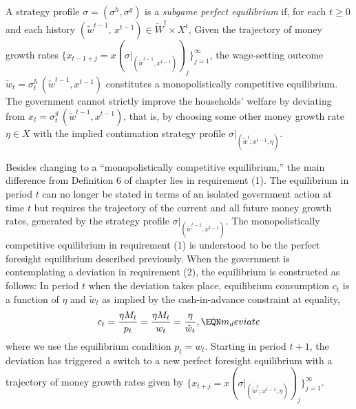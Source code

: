\smallskip
{}  A strategy profile $\sigma = (\sigma^h,\sigma^g)$
is a {\it subgame perfect equilibrium\/} if, for each
$t\geq 0$ and each history $(\tilde w^{t-1},\, x^{t-1})
\in \tilde W^t\times X^t$,\medskip
\noindent
{}  Given the trajectory of money growth rates
$\{x_{t-1+j}= %
 x(\sigma\vert_{(\tilde w^{t-1},x^{t-1})})_j \}_{j=1}^\infty$,
the wage-setting outcome $\tilde w_t =  %
\sigma^h_t\, (\tilde w^{t-1},x^{t-1})$
constitutes a monopolistically competitive equilibrium.
\smallskip
{}  The government cannot strictly improve the households'
welfare by deviating from $x_t = \sigma^g_t\, (\tilde w^{t-1},x^{t-1})$,
that is, by choosing some other money growth rate $\eta \in X$ with
the implied continuation strategy profile
$\sigma\vert_{(\tilde w^t; x^{t-1},\eta)}$.

\smallskip
\medskip\noindent
Besides changing to a ``monopolistically competitive equilibrium,'' the
main difference from Definition 6 of chapter 
 lies in requirement (1).
The equilibrium in period $t$ can no longer be stated in terms of an isolated
government action at time $t$ but requires the trajectory of the current and
all future money growth rates, generated by the strategy profile
$\sigma\vert_{(\tilde w^{t-1},x^{t-1})}$. The monopolistically competitive
equilibrium in requirement (1) is understood to be the perfect
foresight equilibrium described previously.  When the government
is contemplating a deviation in requirement (2),
the equilibrium is constructed as follows: In period $t$
when the deviation takes place, equilibrium consumption $c_t$
is a function of $\eta$ and $\tilde w_t$
as implied by the cash-in-advance constraint at equality,
$$
c_t = {\eta M_t \over p_t} =  {\eta M_t \over w_t}
    = {\eta \over \tilde w_t},          \EQN m_deviate
$$
where we use the equilibrium condition $p_t = w_t$.
Starting in period $t+1$, the deviation has triggered a switch to a new
perfect foresight equilibrium with a trajectory of money growth rates given by
$\{x_{t+j}=x(\sigma\vert_{(\tilde w^t;x^{t-1},\eta)})_j\}_{j=1}^\infty$.


